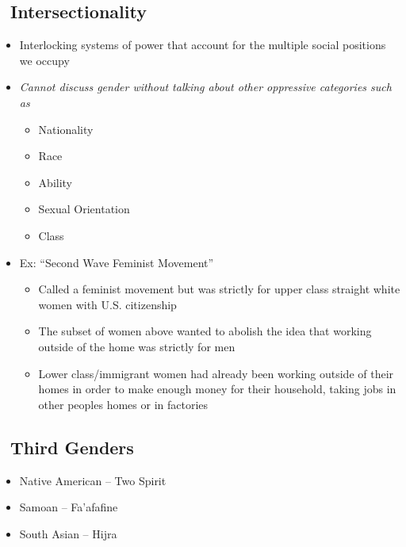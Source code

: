 \documentclass{article}
\begin{document}
\subsection{\ Intersectionality}
\begin{itemize}
  \item Interlocking systems of power that account for the multiple social positions we occupy
  \item \it{Cannot} discuss gender without talking about other oppressive categories such as \begin{itemize}
    \item Nationality
    \item Race
    \item Ability
    \item Sexual Orientation
    \item Class
  \end{itemize}
  \item Ex: ``Second Wave Feminist Movement'' \begin{itemize}
    \item Called a feminist movement but was strictly for upper class straight white women with U.S. citizenship
    \item The subset of women above wanted to abolish the idea that working outside of the home was strictly for men
    \item Lower class/immigrant women had already been working outside of their homes in order to make enough money for their household, taking jobs in other peoples homes or in factories
  \end{itemize}
\end{itemize}

\subsection{\ Third Genders}
\begin{itemize}
  \item Native American -- Two Spirit
  \item Samoan -- Fa'afafine
  \item South Asian -- Hijra
\end{itemize}
\end{document}
